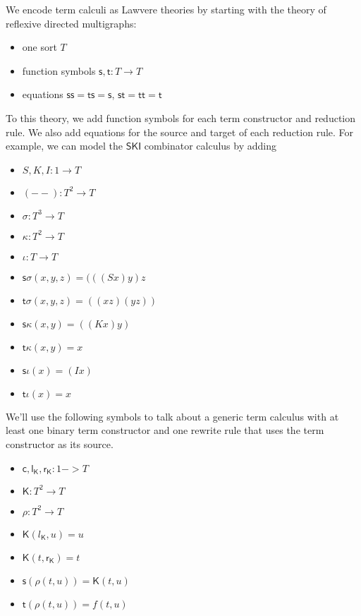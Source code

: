 \documentclass{llncs}
\renewcommand{\:}{\colon}
\begin{document}
We encode term calculi as Lawvere theories by starting with the theory
of reflexive directed multigraphs:

\begin{itemize}
  \item one sort $T$
  \item function symbols $\mathsf{s}, \mathsf{t}: T \rightarrow T$
  \item equations $\mathsf{ss} = \mathsf{ts} = \mathsf{s}$, $\mathsf{st} = \mathsf{tt} = \mathsf{t}$
\end{itemize}

To this theory, we add function symbols for each term constructor and
reduction rule.  We also add equations for the source and target of
each reduction rule.  For example, we can model the $\mathsf{SKI}$ combinator
calculus by adding

\begin{itemize}
  \item $S, K, I : 1 \rightarrow T$
  \item $(- -) : T^{2} \rightarrow T$
  \item $\sigma : T^{3} \rightarrow T$
  \item $\kappa : T^{2} \rightarrow T$
  \item $\iota : T \rightarrow T$
  \item $\mathsf{s}\sigma(x, y, z) = (((S x) y) z$
  \item $\mathsf{t}\sigma(x, y, z) = ((x z) (y z))$
  \item $\mathsf{s}\kappa(x, y) = ((K x) y)$
  \item $\mathsf{t}\kappa(x, y) = x$
  \item $\mathsf{s}\iota(x) = (I x)$
  \item $\mathsf{t}\iota(x) = x$
\end{itemize}

We'll use the following symbols to talk about a generic term calculus
with at least one binary term constructor and one rewrite rule that
uses the term constructor as its source.

\begin{itemize}
  \item $\mathsf{c}, \mathsf{l}_{\mathsf{K}}, \mathsf{r}_{\mathsf{K}} : 1 -> T$
  \item $\mathsf{K} : T^{2} \rightarrow T$
  \item $\rho : T^{2} \rightarrow T$             %
  \item $\mathsf{K}(l_{\mathsf{K}}, u) = u$
  \item $\mathsf{K}(t, \mathsf{r}_{\mathsf{K}}) = t$
  \item $\mathsf{s}(\rho(t,u)) = \mathsf{K}(t, u)$
  \item $\mathsf{t}(\rho(t,u)) = f(t,u)$
\end{itemize}
\end{document}
